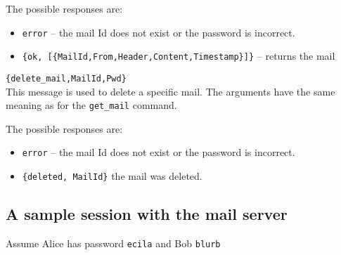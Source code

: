 \documentclass[12pt]{hitec}
\begin{document}
\begin{description}
  The possible responses are:
  
  \begin{itemize}
  
  \item \verb+error+ -- the mail Id does not exist or the password is incorrect.
  
\item \verb+{ok, [{MailId,From,Header,Content,Timestamp}]}+ -- returns the mail
  \end{itemize}

 
\item \verb+{delete_mail,MailId,Pwd}+\\
  This message is used to delete a specific mail. The arguments have the same
  meaning as for the \verb+get_mail+ command.

  The possible responses are:
  
  \begin{itemize}
  
  \item \verb+error+ -- the mail Id does not exist or the password is incorrect.
  \item \verb+{deleted, MailId}+ the mail was deleted.
    
  \end{itemize}

  

\end{description}

\subsection{A sample session with the mail server}

Assume Alice has password \verb+ecila+  and Bob \verb+blurb+
\end{document}
